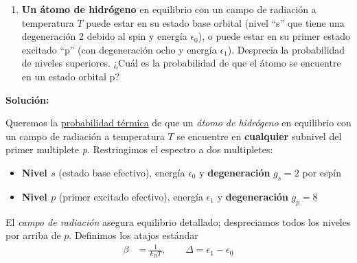 \documentclass{article}
\newenvironment{AGbox}[1][7]%
{%
  \begin{tcolorbox}[
    enhanced, breakable,
    colframe=AppleGreen,
    colback=AppleGreen!#1,
    boxrule=1pt,
    borderline west={2mm}{-10mm}{AppleGreen},
    sharp corners=southwest,
    left=14pt,right=14pt,top=10pt,bottom=10pt,
     boxsep=6pt,
  ]%
}{%
  \end{tcolorbox}%
}
\begin{document}
\begin{AGbox}[8]
	\begin{enumerate}[label={{\textcolor{trueblue}{\textbf{Pr.} \arabic*.4}}}, start=1]
		\item \textbf{Un átomo de hidrógeno} en equilibrio con un campo de radiación a temperatura $T$ puede estar en su estado base orbital (nivel “s” que tiene una degeneración 2 debido al spin y energía $\epsilon_0$), o puede estar en su primer estado excitado “p” (con degeneración ocho y energía $\epsilon_1$). Desprecia la probabilidad de niveles superiores. ¿Cuál es la probabilidad de que el átomo se encuentre en un estado orbital p?
	\end{enumerate}
\end{AGbox}


\textcolor{Cinnabar}{\textbf{Solución:}} 


Queremos la \underline{probabilidad térmica} de que un \textit{átomo de hidrógeno} en equilibrio con un campo de radiación a temperatura $T$ se encuentre en \textbf{cualquier} subnivel del primer multiplete \textit{p}. Restringimos el espectro a dos multipletes:
\begin{itemize}
\item[$\bullet$] \textbf{Nivel $s$} (estado base efectivo), energía $\epsilon_{0}$ y \textbf{degeneración} $g_s=2$ por espín
\item[$\bullet$] \textbf{Nivel $p$} (primer excitado efectivo), energía $\epsilon_{1}$ y \textbf{degeneración} $g_p=8$ 
\end{itemize}

El \textit{campo de radiación} asegura equilibrio detallado; despreciamos todos los niveles por arriba de $p$. Definimos los atajos estándar
\begin{equation}
\begin{split}
\beta &= \frac{1}{k_B T},\qquad 
\Delta = \epsilon_1-\epsilon_0
\end{split}\label{eq:def_beta_delta}
\end{equation}
\end{document}
